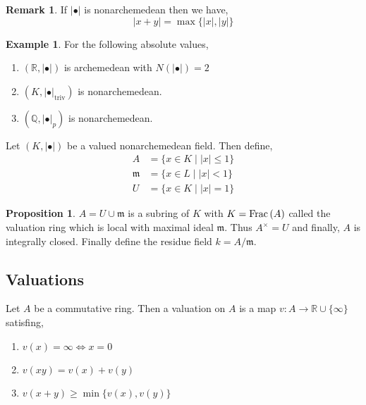 \documentclass[12pt]{extarticle}
\newcommand{\R}{\mathbb{R}}
\theoremstyle{definition}
\newtheorem{proposition}[theorem]{Proposition}
\newtheorem{example}[theorem]{Example}
\newtheorem{remark}{Remark}
\newenvironment{definition}[1][Definition:]{\begin{trivlist}
\item[\hskip \labelsep {\bfseries #1}]}{\end{trivlist}}
\begin{document}
\begin{remark}
If $| \bullet |$ is nonarchemedean then we have,
\[ |x + y| = \max{\{ |x|, |y| \}} \]
\end{remark}

\begin{example}
For the following absolute values,
\begin{enumerate}
\item $(\R, | \bullet |)$ is archemedean with $N(| \bullet |) = 2$
\item $(K, | \bullet |_{\text{triv}})$ is nonarchemedean.
\item $(\mathbb{Q}, | \bullet |_p)$ is nonarchemedean.
\end{enumerate}
\end{example}

\newcommand{\m}{\mathfrak{m}}

\begin{definition}
Let $(K, |\bullet |)$ be a valued nonarchemedean field. Then define,
\begin{align*}
A & = \{ x \in K \mid |x| \le 1 \}
\\
\m & = \{ x \in L \mid |x| < 1 \}
\\
U & = \{ x \in K \mid |x| = 1 \}
\end{align*}
\end{definition}

\begin{proposition}
$A = U \cup \m$ is a subring of $K$ with $K = \mathrm{Frac} \left( A \right)$ called the valuation ring which is local with maximal ideal $\m$. Thus $A^\times = U$ and finally, $A$ is integrally closed. Finally define the residue field $k = A / \m$.
\end{proposition}

\subsection{Valuations}

\begin{definition}
Let $A$ be a commutative ring. Then a valuation on $A$ is a map $v : A \to \R \cup \{ \infty \}$ satisfing,
\begin{enumerate}
\item $v(x) = \infty \iff x = 0$
\item $v(xy) = v(x) + v(y)$
\item $v(x + y) \ge \min{\{ v(x), v(y) \}}$
\end{enumerate}
\end{definition}
\end{document}
